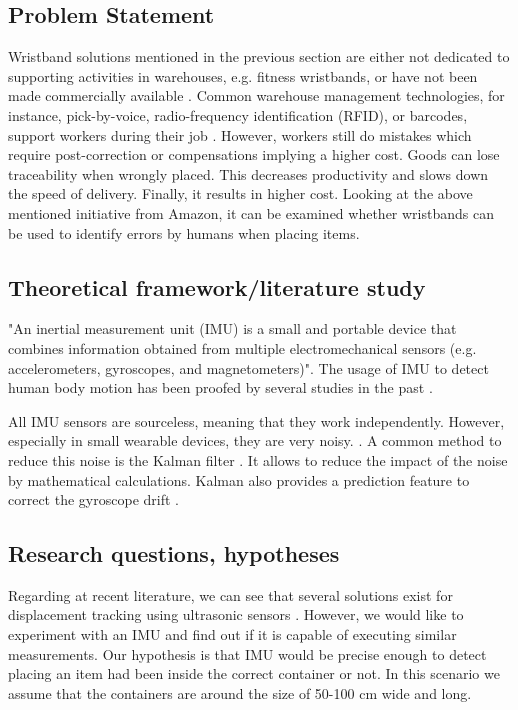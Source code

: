 \documentclass[12pt,twoside, hidelinks]{article}
\begin{document}
\subsection{Problem Statement}
\label{sect:problem}
Wristband solutions mentioned in the previous section are either not dedicated to supporting activities in warehouses, e.g. fitness wristbands, or have not been made commercially available \cite{bergerLudwig2007}. Common warehouse management technologies, for instance, pick-by-voice, radio-frequency identification (RFID), or barcodes, support workers during their job \cite{battini2015}. However, workers still do mistakes which require post-correction or compensations implying a higher cost. Goods can lose traceability when wrongly placed. This decreases productivity and slows down the speed of delivery. Finally, it results in higher cost. Looking at the above mentioned initiative from Amazon, it can be examined whether wristbands can be used to identify errors by humans when placing items.

\subsection{Theoretical framework/literature study}
\label{sect:framework}

"An inertial measurement unit (IMU) is a small and portable device that combines information obtained from multiple electromechanical sensors (e.g. accelerometers, gyroscopes, and magnetometers)"\cite{schall2016}. The usage of IMU to detect human body motion has been proofed by several studies in the past \cite{schall2016} \cite{tao2018} \cite{georgi2015}.

All IMU sensors are sourceless, meaning that they work independently. However, especially in small wearable devices, they are very noisy. \cite{gallagher2004efficient}. A common method to reduce this noise is the Kalman  filter \cite{kalman1960new}. It allows to reduce the impact of the noise by mathematical calculations. Kalman also provides a prediction feature to correct the gyroscope drift \cite{Welch95anintroduction} \cite{Lee2009}.


\subsection{Research questions, hypotheses}
\label{sect:questions}

Regarding at recent literature, we can see that several solutions exist for displacement tracking using ultrasonic sensors \cite{QiYongbin2014Awwu}. However, we would like to experiment with an IMU and find out if it is capable of executing similar measurements. 
Our hypothesis is that IMU would be precise enough to detect placing an item had been inside the correct container or not. In this scenario we assume that the containers are around the size of 50-100 cm wide and long.
\end{document}
